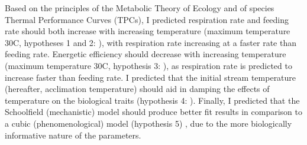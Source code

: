 \documentclass[../../Paper.tex]{subfiles}
\begin{document}
Based on the principles of the Metabolic Theory of Ecology and of species Thermal Performance Curves (TPCs),
I predicted respiration rate and feeding rate should both increase with increasing temperature (maximum temperature 30\degree C, hypotheses 1 and 2:
\cite{gillooly_effects_2001}), with respiration rate increasing at a faster rate than feeding rate. 
Energetic efficiency should decrease with increasing temperature (maximum temperature 30\degree C, hypothesis 3: \cite{savage_effects_2004}), as
respiration rate is predicted to increase faster than feeding rate. I predicted that the initial stream temperature
(hereafter, acclimation temperature) should aid in damping the effects of temperature on the biological traits (hypothesis 4: \cite{marshall_warming_2011}).
Finally, I predicted that the Schoolfield (mechanistic) model should produce better fit results in comparison to
a cubic (phenomenological) model (hypothesis 5) , due to the more biologically informative nature of the parameters.






\end{document}
